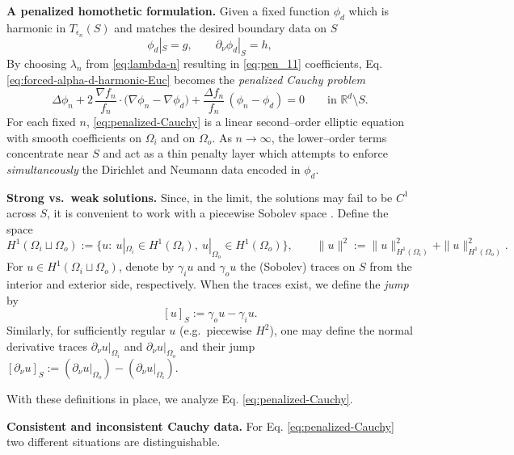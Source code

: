 \documentclass[preprint,12pt]{elsarticle}
\theoremstyle{plain}
\theoremstyle{definition}
\theoremstyle{note}
\newcommand{\R}{\mathbb{R}}
\begin{document}
\medskip
\noindent \textbf{A penalized homothetic formulation.}
Given a fixed function $\phi_d$ which is harmonic in $T_{\epsilon_n}(S)$ and matches the desired boundary data on $S$
\[
\phi_d|_S=g,\qquad \partial_\nu\phi_d|_S=h,
\]
By choosing $\lambda_n$ from \eqref{eq:lambda-n} resulting in \eqref{eq:pen_11} coefficients, Eq. \eqref{eq:forced-alpha-d-harmonic-Euc} becomes the \emph{penalized Cauchy problem}
\begin{equation}\label{eq:penalized-Cauchy}
\boxed{\Delta \phi_n
+2\,\frac{\nabla f_n}{f_n}\cdot\bigl(\nabla\phi_n-\nabla\phi_d\bigr)
+\frac{\Delta f_n}{f_n}\,(\phi_n-\phi_d)=0}
\qquad \text{in }\R^d\setminus S.
\end{equation}
For each fixed $n$, \eqref{eq:penalized-Cauchy} is a linear second--order elliptic equation with smooth coefficients on $\Omega_i$ and on $\Omega_o$. As $n\to\infty$, the lower--order terms concentrate near $S$ and act as a thin penalty layer which attempts to enforce \emph{simultaneously} the Dirichlet and Neumann data encoded in $\phi_d$.

\medskip
\noindent\textbf{Strong vs.\ weak solutions.} Since, in the limit, the solutions may fail to be $C^1$ across $S$, it is convenient to work with a piecewise Sobolev space  \cite{AdamsFournier2003,LionsMagenes1972}. Define the space
\[
H^1(\Omega_i\sqcup \Omega_o)
:=\bigl\{u:\ u|_{\Omega_i}\in H^1(\Omega_i),\ u|_{\Omega_o}\in H^1(\Omega_o)\bigr\},
\qquad
\|u\|^2 := \|u\|^2_{H^1(\Omega_i)}+\|u\|^2_{H^1(\Omega_o)}.
\]
For $u\in H^1(\Omega_i\sqcup\Omega_o)$, denote by $\gamma_i u$ and $\gamma_o u$ the (Sobolev) traces on $S$ from the interior and exterior side, respectively. When the traces exist, we define the \emph{jump} by
\[
[u]_S := \gamma_o u-\gamma_i u .
\]
Similarly, for sufficiently regular $u$ (e.g.\ piecewise $H^2$), one may define the normal derivative traces $\partial_\nu u|_{\Omega_i}$ and $\partial_\nu u|_{\Omega_o}$ and their jump $[\partial_\nu u]_S := (\partial_\nu u|_{\Omega_o})-(\partial_\nu u|_{\Omega_i})$.

\noindent
With these definitions in place, we analyze Eq. \eqref{eq:penalized-Cauchy}.

\medskip
\noindent\textbf{Consistent and inconsistent Cauchy data.} For Eq. \eqref{eq:penalized-Cauchy} two different situations are distinguishable.
\end{document}

